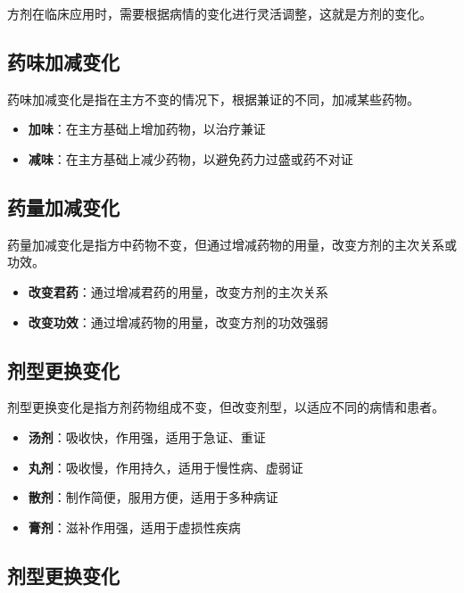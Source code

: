 \documentclass[12pt,UTF8]{ctexbook}
\begin{document}
方剂在临床应用时，需要根据病情的变化进行灵活调整，这就是方剂的变化。

\subsection{药味加减变化}

药味加减变化是指在主方不变的情况下，根据兼证的不同，加减某些药物。

\begin{itemize}
\item \textbf{加味}：在主方基础上增加药物，以治疗兼证
\item \textbf{减味}：在主方基础上减少药物，以避免药力过盛或药不对证
\end{itemize}

\subsection{药量加减变化}

药量加减变化是指方中药物不变，但通过增减药物的用量，改变方剂的主次关系或功效。

\begin{itemize}
\item \textbf{改变君药}：通过增减君药的用量，改变方剂的主次关系
\item \textbf{改变功效}：通过增减药物的用量，改变方剂的功效强弱
\end{itemize}

\subsection{剂型更换变化}

剂型更换变化是指方剂药物组成不变，但改变剂型，以适应不同的病情和患者。

\begin{itemize}
\item \textbf{汤剂}：吸收快，作用强，适用于急证、重证
\item \textbf{丸剂}：吸收慢，作用持久，适用于慢性病、虚弱证
\item \textbf{散剂}：制作简便，服用方便，适用于多种病证
\item \textbf{膏剂}：滋补作用强，适用于虚损性疾病
\end{itemize}

\subsection{剂型更换变化}
\end{document}
